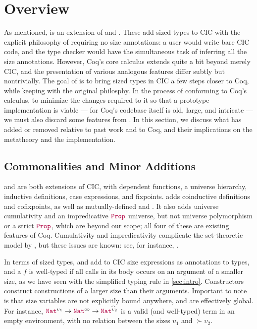 \section{Overview}\label{sec:overview}

As mentioned, \lang is an extension of \CIChat and \CIChatminus.
These add sized types to CIC with the explicit philosophy of requiring no size annotations:
a user would write bare CIC code, and the type checker would have the simultaneous task of inferring all the size annotations.
However, Coq's core calculus extends quite a bit beyond merely CIC,
and the presentation of various analogous features differ subtly but nontrivially.
The goal of \lang is to bring sized types in CIC a few steps closer to Coq,
while keeping with the original philosphy.
In the process of conforming to Coq's calculus, to minimize the changes required to it so that a prototype implementation is viable
--- for Coq's codebase itself is old, large, and intricate ---
we must also discard some features from \CIChatminus.
In this section, we discuss what \lang has added or removed relative to past work and to Coq,
and their implications on the metatheory and the implementation.

\subsection{Commonalities and Minor Additions}

\lang and \CIChatminus are both extensions of CIC, with dependent functions, a universe hierarchy, inductive definitions, case expressions, and fixpoints.
\lang adds coinductive definitions and cofixpoints, as well as mutually-defined \coinductives and \cofixpoints.
It also adds universe cumulativity and an impredicative $\Prop$ universe,
but not universe polymorphism or a strict $\Prop$,
which are beyond our scope;
all four of these are existing features of Coq.
Cumulativity and impredicativity complicate the set-theoretic model by \citet{cic-hat-minus}, but these issues are known: see, for instance, \citet{not-so-simple-cc}.

In terms of sized types, \lang and \CIChatminus add to CIC size expressions as annotations to \coinductive types,
and a \cofixpoint $f$ is well-typed if all \corecursive calls in its body occurs on an argument of a smaller size,
as we have seen with the simplified typing rule in \autoref{sec:intro}.
Constructors construct constructions of a larger size than their \corecursive arguments.
Important to note is that size variables are not explicitly bound anywhere, and are effectively global.
For instance, $\Nat^{\upsilon_1} \rightarrow \Nat^\infty \rightarrow \Nat^{\succ{\upsilon}_2}$ is a valid (and well-typed) term in an empty environment, with no relation between the sizes $\upsilon_1$ and $\succ{\upsilon}_2$.

